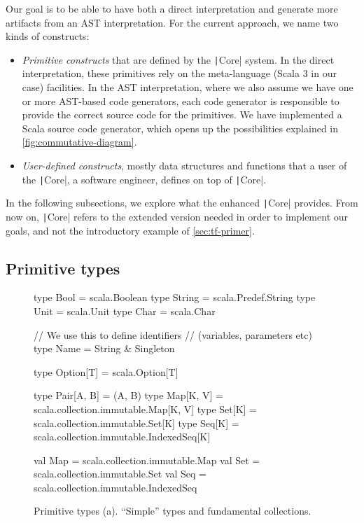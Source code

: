 \documentclass[11pt]{article}
\newcommand{\ScalaI}[1]{\texttt|#1|}
\begin{document}
Our goal is to be able to have both a direct interpretation and generate more artifacts from an AST interpretation. For the current approach, we name two kinds of constructs:
\begin{itemize}
  \item \textit{Primitive constructs} that are defined by the \ScalaI{Core} system. In the direct interpretation, these primitives rely on the meta-language (Scala 3 in our case) facilities. In the AST interpretation, where we also assume we have one or more AST-based code generators, each code generator is responsible to provide the correct source code for the primitives. We have implemented a Scala source code generator, which opens up the possibilities explained in \autoref{fig:commutative-diagram}.
  \item \textit{User-defined constructs}, mostly data structures and functions that a user of the \ScalaI{Core}, a software engineer, defines on top of \ScalaI{Core}.
\end{itemize}

In the following subsections, we explore what the enhanced \ScalaI{Core} provides. From now on, \ScalaI{Core} refers to the extended version needed in order to implement our goals, and not the introductory example of \autoref{sec:tf-primer}.
\subsection{Primitive types}
\label{sec:prim:types}

\begin{figure}[t]
\begin{ScalaBlock}
type Bool   = scala.Boolean
type String = scala.Predef.String
type Unit   = scala.Unit
type Char   = scala.Char

// We use this to define identifiers
// (variables, parameters etc)
type Name = String & Singleton

type Option[T]    = scala.Option[T]

type Pair[A, B] = (A, B)
type Map[K, V] = scala.collection.immutable.Map[K, V]
type Set[K] = scala.collection.immutable.Set[K]
type Seq[K] = scala.collection.immutable.IndexedSeq[K]

val Map = scala.collection.immutable.Map
val Set = scala.collection.immutable.Set
val Seq = scala.collection.immutable.IndexedSeq

\end{ScalaBlock}
\caption{Primitive types (a). ``Simple'' types and fundamental collections.}
\label{fig:prim:types}
\hrulefill
\end{figure}
\end{document}
